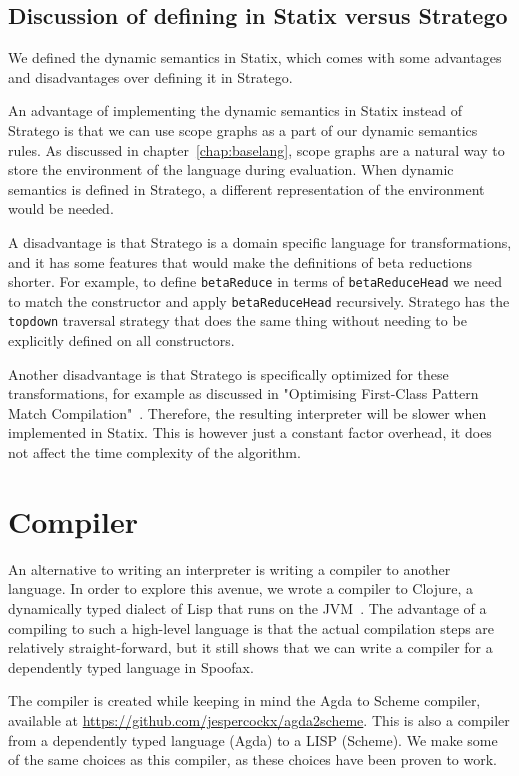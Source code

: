 \subsection{Discussion of defining in Statix versus Stratego}

We defined the dynamic semantics in Statix, which comes with some advantages and disadvantages over defining it in Stratego. 

An advantage of implementing the dynamic semantics in Statix instead of Stratego is that we can use scope graphs as a part of our dynamic semantics rules. As discussed in chapter~\ref{chap:baselang}, scope graphs are a natural way to store the environment of the language during evaluation. When dynamic semantics is defined in Stratego, a different representation of the environment would be needed.

A disadvantage is that Stratego is a domain specific language for transformations, and it has some features that would make the definitions of beta reductions shorter. For example, to define \verb|betaReduce| in terms of \verb|betaReduceHead| we need to match the constructor and apply \verb|betaReduceHead| recursively. Stratego has the \verb|topdown| traversal strategy that does the same thing without needing to be explicitly defined on all constructors.

Another disadvantage is that Stratego is specifically optimized for these transformations, for example as discussed in "Optimising First-Class Pattern Match Compilation"~\cite{fcpmc}. Therefore, the resulting interpreter will be slower when implemented in Statix. This is however just a constant factor overhead, it does not affect the time complexity of the algorithm.

\section{Compiler}
An alternative to writing an interpreter is writing a compiler to another language. In order to explore this avenue, we wrote a compiler to Clojure, a dynamically typed dialect of Lisp that runs on the JVM~\cite{clojure}. The advantage of a compiling to such a high-level language is that the actual compilation steps are relatively straight-forward, but it still shows that we can write a compiler for a dependently typed language in Spoofax.

The compiler is created while keeping in mind the Agda to Scheme compiler, available at \url{https://github.com/jespercockx/agda2scheme}. This is also a compiler from a dependently typed language (Agda) to a LISP (Scheme). We make some of the same choices as this compiler, as these choices have been proven to work.

